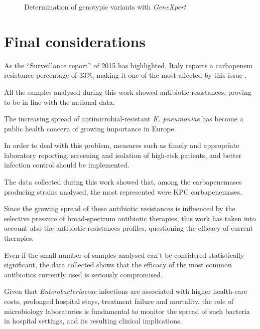 \documentclass[11pt]{report}
\begin{document}
\begin{figure}[h!]
\centering

\caption{Determination of genotypic variants with \emph{GeneXpert}}
\label{genexpert}
\end{figure}

\chapter{Final considerations}

As the ``Surveillance report'' of 2015 has highlighted, Italy reports a carbapenem resistance percentage of 33$\%$, making it one of the most affected by this issue \cite{ECDC_Surveillance}.

All the samples analysed during this work showed antibiotic resistances, proving to be in line with the national data.

The increasing spread of antimicrobial-resistant \emph{K. pneumoniae} has become a public health concern of growing importance in Europe.

In order to deal with this problem, measures such as timely and appropriate laboratory reporting, screening and isolation of high-risk patients, and better infection control should be implemented.

The data collected during this work showed that, among the carbapenemases producing strains analysed, the most represented were KPC carbapenemases.

Since the growing spread of these antibiotic resistances is influenced by the selective pressure of broad-spectrum antibiotic therapies, this work has taken into account also the antibiotic-resistances profiles, questioning the efficacy of current therapies.
 
Even if the small number of samples analysed can't be considered statistically significant, the data collected shows that the efficacy of the most common antibiotics currently used is seriously compromised.

Given that \emph{Enterobacteriaceae} infections are associated with higher health-care costs, prolonged hospital stays, treatment failure and mortality, the role of microbiology laboratories is fundamental to monitor the spread of such bacteria in hospital settings, and its resulting clinical implications.



\end{document}
